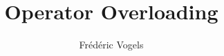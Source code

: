 
\usetikzlibrary{shadows,shapes.multipart}

\title{Operator Overloading}
\author{Fr\'ed\'eric Vogels}


\lstset{language=c++14}




\begin{frame}
  \titlepage
\end{frame}










